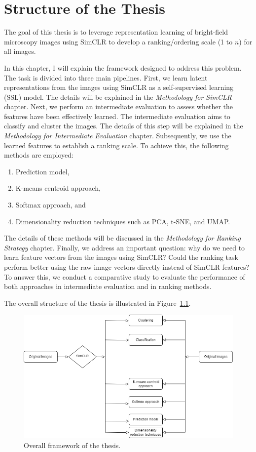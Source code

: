 \chapter{Structure of the Thesis}\label{ch:Structure of the Thesis}

The goal of this thesis is to leverage representation learning of bright-field microscopy images using SimCLR to develop a ranking/ordering scale 
(1 to \( n \)) for all images. 

In this chapter, I will explain the framework designed to address this problem. The task is divided into three main pipelines. First, we learn latent representations from the images using SimCLR as a self-supervised learning (SSL) model. The details will be explained in the 
\textit{Methodology for SimCLR} chapter. Next, we perform an intermediate evaluation to assess whether the features have been effectively learned. The intermediate evaluation aims to classify and cluster the images. The details of this step will be explained in the \textit{Methodology for Intermediate Evaluation} chapter. Subsequently, we use the learned features to establish a ranking scale. To achieve this, the following methods are employed:

\begin{enumerate}
  \setlength{\itemsep}{0pt}
  \item Prediction model,
  \item K-means centroid approach,
  \item Softmax approach, and
  \item Dimensionality reduction techniques such as PCA, t-SNE, and UMAP.
\end{enumerate}
The details of these methods will be discussed in the \textit{Methodology for Ranking Strategy} chapter. Finally, we address an important question: why do we need to learn feature vectors from the images using SimCLR? Could the ranking task perform better using the raw image vectors directly instead of SimCLR features? To answer this, we conduct a comparative study to evaluate the performance of both approaches in intermediate evaluation and in ranking methods.

The overall structure of the thesis is illustrated in Figure~\ref{fig:BigOutline}.
\begin{figure}[H]
  \centering
  \includegraphics[scale=0.5]{figures/final_big_pic.png} 
  \caption{Overall framework of the thesis.}
  \label{fig:BigOutline}
\end{figure}
